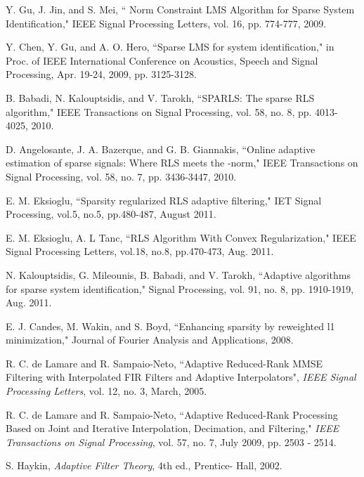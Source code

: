\documentclass[10pt,onecolumn]{IEEEtran}
\begin{document}
\begin{thebibliography}{10}
{

{\linespread{1}

Y. Gu, J. Jin, and S. Mei, `` Norm Constraint LMS Algorithm for
Sparse System Identification," IEEE Signal Processing Letters, vol.
16, pp. 774-777, 2009.

Y. Chen, Y. Gu, and A. O. Hero, ``Sparse LMS for system
identification," in Proc. of IEEE International Conference on
Acoustics, Speech and Signal Processing, Apr. 19-24, 2009, pp.
3125-3128.

B. Babadi, N. Kalouptsidis, and V. Tarokh, ``SPARLS: The sparse RLS
algorithm," IEEE Transactions on Signal Processing, vol. 58, no. 8,
pp. 4013-4025, 2010.

D. Angelosante, J. A. Bazerque, and G. B. Giannakis, ``Online
adaptive estimation of sparse signals: Where RLS meets the
-norm," IEEE Transactions on Signal Processing, vol. 58, no. 7,
pp. 3436-3447, 2010.

E. M. Eksioglu, ``Sparsity regularized RLS adaptive filtering," IET
Signal Processing, vol.5, no.5, pp.480-487, August 2011.

E. M. Eksioglu, A. L Tanc, ``RLS Algorithm With Convex
Regularization," IEEE Signal Processing Letters, vol.18, no.8,
pp.470-473, Aug. 2011.

N. Kalouptsidis, G. Mileounis, B. Babadi, and V. Tarokh, ``Adaptive
algorithms for sparse system identification," Signal Processing,
vol. 91, no. 8, pp. 1910-1919, Aug. 2011.

E. J. Candes, M. Wakin, and S. Boyd, ``Enhancing sparsity
by reweighted l1 minimization," Journal of Fourier Analysis and Applications, 2008.

R. C. de Lamare and R. Sampaio-Neto, ``Adaptive Reduced-Rank MMSE
Filtering with Interpolated FIR Filters and Adaptive Interpolators",
\textit{IEEE Signal Processing Letters}, vol. 12, no. 3, March,
2005.

R. C. de Lamare and R. Sampaio-Neto, ``Adaptive Reduced-Rank
Processing Based on Joint and Iterative Interpolation, Decimation,
and Filtering," \textit{IEEE Transactions on Signal Processing},
vol. 57,  no. 7,  July 2009, pp. 2503 - 2514.

S. Haykin, \textit{ Adaptive Filter Theory}, 4th ed., Prentice-
Hall, 2002.

} }
\end{thebibliography}
\end{document}
